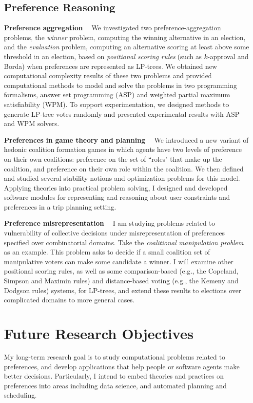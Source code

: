 \documentclass[11pt]{article}
\begin{document}
\subsection{Preference Reasoning}
\smallskip \noindent \textbf{Preference aggregation  \ }
We investigated two preference-aggregation 
problems, the \emph{winner} problem, computing the winning alternative in an election,
and the \emph{evaluation} problem, computing an alternative scoring at least above
some threshold in an election,
based on \textit{positional scoring rules} (such as $k$-approval and Borda) 
when preferences are represented as LP-trees\cite{LiuT:LPT_ASP}. 
We obtained new computational complexity results of these two problems and
provided computational methods to model and solve the problems in two programming formalisms, 
answer set programming (ASP) and weighted partial maximum satisfiability (WPM).
To support experimentation, we designed methods
to generate LP-tree votes randomly and presented experimental results
with ASP and WPM solvers.

\smallskip \noindent \textbf{Preferences in game theory and planning  \ }
We introduced a new variant of hedonic coalition formation
games in which agents have two levels of preference on their own coalitions:
preference on the set of ``roles" that make up the coalition, and
preference on their own role within the coalition\cite{Spradling}. 
We then defined and studied several stability
notions and optimization problems for this model.
Applying theories into practical problem solving, I designed and developed software modules
for representing and reasoning about user constraints and preferences in a trip planning
setting.

\smallskip \noindent \textbf{Preference misrepresentation  \ }
I am studying problems related to vulnerability of collective decisions under misrepresentation of preferences
specified over combinatorial domains.
Take the \textit{coalitional manipulation problem} as an example.
This problem asks to decide if a small coalition set of manipulative
voters can make some candidate a winner.
I will examine other positional scoring rules, as well as
some comparison-based (e.g., the Copeland, Simpson and Maximin rules) and 
distance-based voting (e.g., the Kemeny and Dodgson rules) systems, for LP-trees,
and extend these results to elections over complicated domains to more general cases.

\section{Future Research Objectives}
\noindent My long-term research goal is to study computational problems related to preferences, and 
develop applications that help people or software agents make better decisions.
Particularly, I intend to embed theories and practices on preferences into areas including
data science, and automated planning and scheduling.
\end{document}
